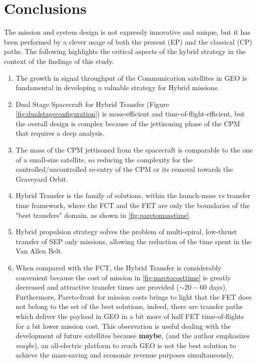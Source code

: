 \section{Conclusions}
\label{sec:conclusions}
The mission and system design is not expressly innovative and unique, but it has been performed by a clever usage of both the present (EP) and the classical (CP) paths. 
The following highlights the critical aspects of the hybrid strategy in the context of the findings of this study.
\begin{enumerate}[label=(\alph*)]
\item The growth in signal throughput of the Communication satellites in GEO is fundamental in developing a valuable strategy for Hybrid missions.
\item Dual Stage Spacecraft for Hybrid Transfer (Figure \ref{fig:dualstageconfiguration}) is mass-efficient and time-of-flight-efficient, but the overall design is complex because of the jettisoning phase of the CPM that requires a deep analysis.
\item The mass of the CPM jettisoned from the spacecraft is comparable to the one of a small-size satellite, so reducing the complexity for the controlled/uncontrolled re-entry of the CPM or its removal towards the Graveyard Orbit.
\item Hybrid Transfer is the family of solutions, within the launch-mass vs transfer time framework, where the FCT and the FET are only the boundaries of the "best transfers" domain, as shown in \figurename\ref{fig:paretomasstime}.
\item Hybrid propulsion strategy solves the problem of multi-spiral, low-thrust transfer of SEP only missions, allowing the reduction of the time spent in the Van Allen Belt.
\item When compared with the FCT, the Hybrid Transfer is considerably convenient because the cost of mission in \figurename\ref{fig:paretocosttime} is greatly decreased and attractive transfer times are provided ($\sim 20-60$ days).
Furthermore, Pareto-front for mission costs brings to light that the FET does not belong to the set of the best solutions, indeed, there are transfer paths which deliver the payload in GEO in a bit more of half FET time-of-flights for a bit lower mission cost.
This observation is useful dealing with the development of future satellites because \textbf{maybe}, (and the author emphasizes \emph{maybe}), an all-electric platform to reach GEO is not the best solution to achieve the mass-saving and economic revenue purposes simultaneously.

\end{enumerate}
